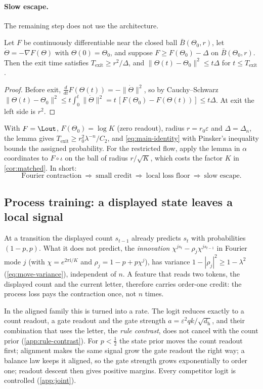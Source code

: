 \paragraph{Slow escape.} The remaining step does not use the architecture.
\begin{lemma}\label{lem:escape}
Let $F$ be continuously differentiable near the closed ball $\bar B(\Theta_0,r)$, let $\dot\Theta=-\nabla F(\Theta)$ with $\Theta(0)=\Theta_0$, and suppose $F\ge F(\Theta_0)-\Delta$ on $\bar B(\Theta_0,r)$. Then the exit time satisfies $T_{\mathrm{exit}}\ge r^2/\Delta$, and $\|\Theta(t)-\Theta_0\|^2\le t\Delta$ for $t\le T_{\mathrm{exit}}$.
\end{lemma}
\begin{proof}
Before exit, $\frac{d}{dt}F(\Theta(t))=-\|\dot\Theta\|^2$, so by Cauchy--Schwarz
$\|\Theta(t)-\Theta_0\|^2\le t\int_0^t\|\dot\Theta\|^2=t\,[F(\Theta_0)-F(\Theta(t))]\le t\Delta$. At exit the left side is $r^2$.
\end{proof}
With $F=\Lout$, $F(\Theta_0)=\log K$ (zero readout), radius $r=r_0\varepsilon$ and $\Delta=\Delta_n$, the lemma gives $T_{\mathrm{exit}}\ge r_0^2\lambda^{-n}/C_2$, and \cref{eq:main-identity} with Pinsker's inequality bounds the assigned probability. For the restricted flow, apply the lemma in $\alpha$ coordinates to $F\circ\iota$ on the ball of radius $r/\sqrt K$, which costs the factor $K$ in \cref{cor:matched}. In short:
\[
\text{Fourier contraction}\ \Longrightarrow\ \text{small credit}\ \Longrightarrow\ \text{local loss floor}\ \Longrightarrow\ \text{slow escape}.
\]

\subsection{Process training: a displayed state leaves a local signal}
At a transition the displayed count $s_{t-1}$ already predicts $s_t$ with probabilities $(1-p,p)$. What it does not predict, the \emph{innovation} $\chi^{js_t}-\rho_j\chi^{js_{t-1}}$ in Fourier mode $j$ (with $\chi=e^{2\pi\mathrm i/K}$ and $\rho_j=1-p+p\chi^j$), has variance $1-|\rho_j|^2\ge1-\lambda^2$ (\cref{eq:move-variance}), independent of $n$. A feature that reads two tokens, the displayed count and the current letter, therefore carries order-one credit: the process loss pays the contraction once, not $n$ times.

In the aligned family this is turned into a rate. The logit reduces exactly to a count readout, a gate readout and the gate strength $a=\varepsilon^2qk/\sqrt{d_{\mathrm h}}$, and their combination that uses the letter, the \emph{rule contrast}, does not cancel with the count prior (\cref{app:rule-contrast}). For $p<\frac12$ the state prior moves the count readout first; alignment makes the same signal grow the gate readout the right way; a balance law keeps it aligned, so the gate strength grows exponentially to order one; readout descent then gives positive margins. Every competitor logit is controlled (\cref{app:joint}).

